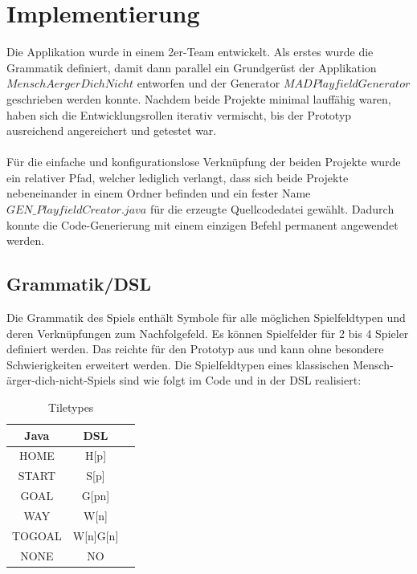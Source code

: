 \documentclass[conference]{IEEEtran}
\begin{document}
\section{Implementierung}
Die Applikation wurde in einem 2er-Team entwickelt. Als erstes wurde die Grammatik definiert, damit dann parallel
ein Grundger\"ust der Applikation $MenschAergerDichNicht$ entworfen und der Generator $MADPlayfieldGenerator$ geschrieben werden konnte. Nachdem beide Projekte minimal lauff\"ahig waren, haben sich die Entwicklungsrollen iterativ vermischt, bis der Prototyp ausreichend angereichert und getestet
war.
\\\\
F\"ur die einfache und konfigurationslose Verkn\"upfung der beiden Projekte wurde ein relativer Pfad, welcher lediglich verlangt, dass sich beide Projekte nebeneinander in einem Ordner befinden und ein fester Name $GEN\_PlayfieldCreator.java$ f\"ur die erzeugte Quellcodedatei gew\"ahlt.
Dadurch konnte die Code-Generierung mit einem einzigen Befehl permanent angewendet werden.

\subsection{Grammatik/DSL}
  Die Grammatik des Spiels enth\"alt Symbole f\"ur alle m\"oglichen Spielfeldtypen und deren Verkn\"upfungen zum Nachfolgefeld.
  Es k\"onnen Spielfelder f\"ur 2 bis 4 Spieler definiert werden. Das reichte f\"ur den Prototyp aus und kann ohne besondere
  Schwierigkeiten erweitert werden. Die Spielfeldtypen eines klassischen Mensch-\"arger-dich-nicht-Spiels sind wie folgt im Code und in der DSL realisiert:

\begin{table}[h!]
  \centering
  \caption{Tiletypes}
  \label{tab:table1}
  \begin{tabular}{ccc}
    \toprule
    Java & DSL\\
    \midrule
    HOME & H[p]\\
    START & S[p]\\
    GOAL & G[pn] \\
    WAY & W[n] \\
    TOGOAL & W[n]G[n] \\
    NONE & NO \\
    \bottomrule
  \end{tabular}
\end{table}
\end{document}
